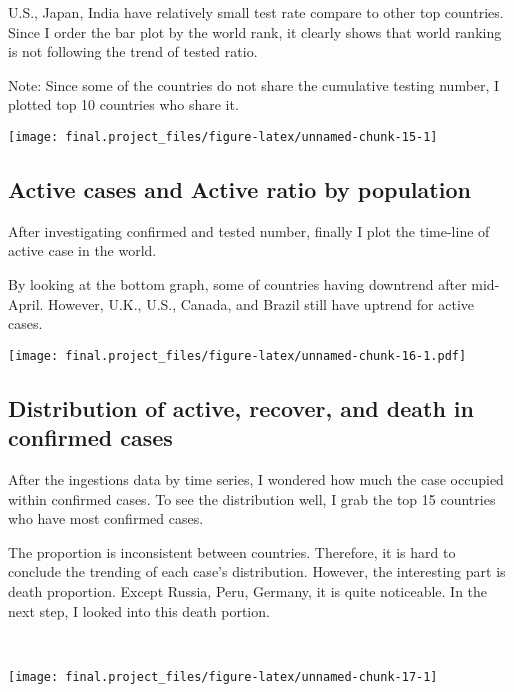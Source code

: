 \documentclass[
  11pt,
]{article}
\begin{document}
U.S., Japan, India have relatively small test rate compare to other top
countries. Since I order the bar plot by the world rank, it clearly
shows that world ranking is not following the trend of tested ratio.

Note: Since some of the countries do not share the cumulative testing
number, I plotted top 10 countries who share it. ~

\begin{center}\texttt{[image: final.project\_files/figure-latex/unnamed-chunk-15-1]} \end{center}

\hypertarget{active-cases-and-active-ratio-by-population}{%
\subsection{Active cases and Active ratio by
population}\label{active-cases-and-active-ratio-by-population}}

After investigating confirmed and tested number, finally I plot the
time-line of active case in the world.

By looking at the bottom graph, some of countries having downtrend after
mid-April. However, U.K., U.S., Canada, and Brazil still have uptrend
for active cases.

\texttt{[image: final.project\_files/figure-latex/unnamed-chunk-16-1.pdf]}

\hypertarget{distribution-of-active-recover-and-death-in-confirmed-cases}{%
\subsection{Distribution of active, recover, and death in confirmed
cases}\label{distribution-of-active-recover-and-death-in-confirmed-cases}}

After the ingestions data by time series, I wondered how much the case
occupied within confirmed cases. To see the distribution well, I grab
the top 15 countries who have most confirmed cases.

The proportion is inconsistent between countries. Therefore, it is hard
to conclude the trending of each case's distribution. However, the
interesting part is death proportion. Except Russia, Peru, Germany, it
is quite noticeable. In the next step, I looked into this death portion.

~

\begin{center}\texttt{[image: final.project\_files/figure-latex/unnamed-chunk-17-1]} \end{center}
\end{document}
